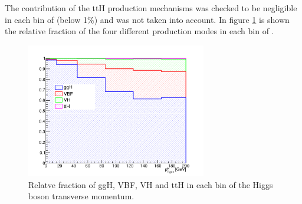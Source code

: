 The contribution of the ttH production mechanisms was checked to be negligible in each bin of \pth (below 1\%) and was not taken into account. In figure \ref{fig:signal_comp} is shown the relative fraction of the four different production modes in each bin of \pth.

\begin{figure}[htb]
\centering
\includegraphics[width=0.7\textwidth]{images/signal_composition_ttH.pdf}
\caption{Relatve fraction of ggH, VBF, VH and ttH in each bin of the Higgs boson transverse momentum.}\label{fig:signal_comp}
\end{figure}
